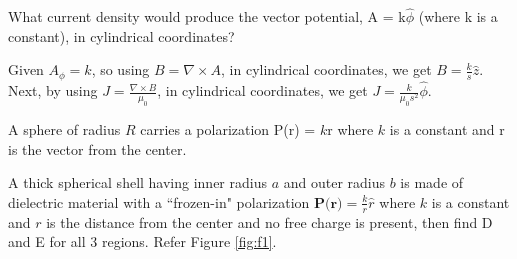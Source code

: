 \documentclass[../main.tex]{subfiles}
\begin{document}
\begin{questions}
\question What current density would produce the vector potential, A = k$\hat{\phi}$ (where k is a constant), in cylindrical coordinates?
\begin{solution}
Given $A_{\phi}=k$, so using $B=\nabla\times A$, in cylindrical coordinates, we get $B = \frac{k}{s}\hat{z}$.\\
Next, by using $J=\frac{\nabla\times B}{\mu_0}$, in cylindrical coordinates, we get $J=\frac{k}{\mu_0 s^2}\hat{\phi}$.
\end{solution}
	
\question A sphere of radius $R$ carries a polarization
P(r) = $k$r where $k$ is a constant and r is the vector from the center.

	
\question A thick spherical shell having inner radius $a$ and outer radius $b$ is made of dielectric material with a ``frozen-in" polarization $\textbf{P(r)}=\frac{k}{r}\hat{r}$ where $k$ is a constant and $r$ is the distance from the center and no free charge is present, then find D and E for all 3 regions. Refer Figure \ref{fig:f1}.

\begin{figure}[H]
	\centering
\end{figure}
\end{questions}
\end{document}
